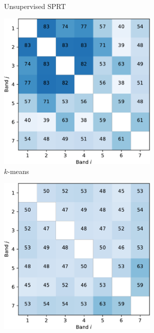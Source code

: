 \documentclass{article}
\begin{document}
\begin{figure}[h]
\begin{subfigure}[b]{0.49\linewidth}
    \caption{Unsupervised SPRT} 
    \label{fig7:b} 
    \end{subfigure} 
  \begin{subfigure}[b]{0.49\linewidth}
    \centering
    \includegraphics[width=0.85\textwidth]{kmeans-crop.pdf} 
    \caption{$k$-means} 
    \label{fig7:c} 
  \end{subfigure}%
  \begin{subfigure}[b]{0.49\linewidth}
    \centering
    \includegraphics[width=0.85\textwidth]{gmm-crop.pdf} 

\end{subfigure}
\end{figure}
\end{document}
